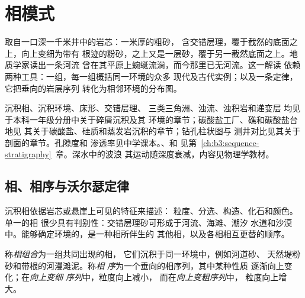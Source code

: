 \chapter{相模式}\label{ch:b3:facies-models}

取自一口深一千米井中的岩芯：一米厚的粗砂，
含交错层理，覆于截然的底面之上，向上变细为带有
根迹的粉砂，之上又是一层砂，覆于另一截然底面之上。地质学家读出一条河流
曾在其平原上蜿蜒流淌，而今那里已无河流。这一解读
依赖两种工具：一组，每一组概括同一环境的众多
现代及古代实例；以及一条定律，它把垂向的岩层序列
转化为相邻环境的分布图。

\begin{recall}
沉积相、沉积环境、床形、交错层理、
三类三角洲、浊流、浊积岩和递变层
均见于本科一年级分册中关于碎屑沉积及其
环境的章节；碳酸盐工厂、礁和碳酸盐台地见
其关于碳酸盐、硅质和蒸发岩沉积的章节；钻孔柱状图与
测井对比见其关于剖面的章节。孔隙度和
渗透率见中学课本。、和
见第~\ref{ch:b3:sequence-stratigraphy}~章。深水中的波浪
其运动随深度衰减，内容见物理学教材。
\end{recall}

\section{相、相序与沃尔瑟定律}\label{sec:b3:facies-models:walther}

沉积相依据岩芯或悬崖上可见的特征来描述：
粒度、分选、构造、化石和颜色。单一的相
很少具有判别性：交错层理砂可形成于河流、海滩、潮汐
水道和沙漠中。能够确定环境的，是一种相所伴生的
其他相，以及各相相互更替的顺序。

\begin{definition}[相组合与相序]\label{def:b3:facies-models:association}
称\emph{相组合}为一组共同出现的相，
它们沉积于同一环境中，例如河道砂、
天然堤粉砂和带根的河漫滩泥。称\emph{相
序}为一个垂向的相序列，其中某种性质
逐渐向上变化；在\emph{向上变细
序列}中，粒度向上减小，
而在\emph{向上变粗序列}中，
粒度向上增大。
\end{definition}

